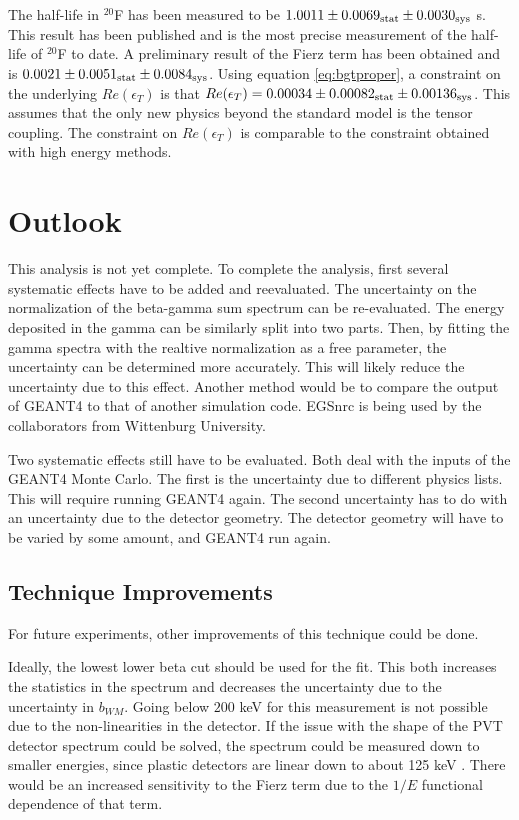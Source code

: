 \documentclass[../MaxHughesThesis.tex]{subfiles}
\begin{document}
The half-life in $^{20}$F has been measured to be  $1.0011 \pm   0.0069_{\rm{stat}}  \pm 0.0030_{\rm{sys}}$ s.
This result has been published and is the most precise measurement of the half-life of $^{20}$F to date.
A preliminary result of the Fierz term has been obtained and is $0.0021 \pm 0.0051_{\rm{stat}} \pm 0.0084_{\rm{sys}}$.
Using equation \ref{eq:bgtproper}, a constraint on the underlying $Re(\epsilon_{T})$ is that $Re(\epsilon_{T}) = 0.00034 \pm 0.00082_{\rm{stat}} \pm 0.00136_{\rm{sys}}$.
This assumes that the only new physics beyond the standard model is the tensor coupling. 
The constraint on $Re(\epsilon_{T})$ is comparable to the constraint obtained with high energy methods.

\section{Outlook}
This analysis is not yet complete.
To complete the analysis, first several systematic effects have to be added and reevaluated.
The uncertainty on the normalization of the beta-gamma sum spectrum can be re-evaluated.
The energy deposited in the gamma can be similarly split into two parts.
Then, by fitting the gamma spectra with the realtive normalization as a free parameter, the uncertainty can be determined more accurately.
This will likely reduce the uncertainty due to this effect.
Another method would be to compare the output of GEANT4 to that of another simulation code.
EGSnrc is being used by the collaborators from Wittenburg University. 

Two systematic effects still have to be evaluated.
Both deal with the inputs of the GEANT4 Monte Carlo.
The first is the uncertainty due to different physics lists. 
This will require running GEANT4 again.
The second uncertainty has to do with an uncertainty due to the detector geometry.
The detector geometry will have to be varied by some amount, and GEANT4 run again.


\subsection{Technique Improvements}
For future experiments, other improvements of this technique could be done.

Ideally, the lowest lower beta cut should be used for the fit.
This both increases the statistics in the spectrum and decreases the uncertainty due to the uncertainty in $b_{WM}$.
Going below $200$ keV for this measurement is not possible due to the non-linearities in the detector.
If the issue with the shape of the PVT detector spectrum could be solved, the spectrum could be measured down to smaller energies, since plastic detectors are linear down to about 125 keV \cite{Kno10}. 
There would be an increased sensitivity to the Fierz term due to the $1/E$ functional dependence of that term.
\end{document}
